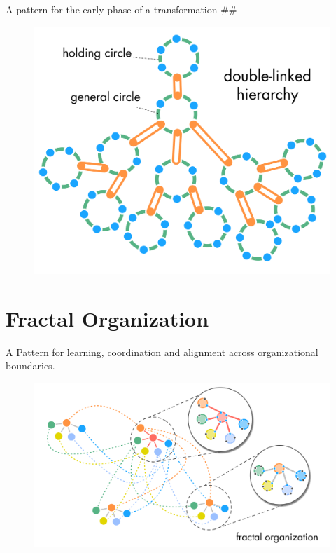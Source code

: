 A pattern for the early phase of a transformation \#\#

\begin{figure}[htbp]
\centering
\includegraphics[keepaspectratio,width=\textwidth,height=0.75\textheight]{img/structural-patterns/double-linked-hierarchy.png}
\end{figure}

\section{Fractal Organization}
\label{fractalorganization}

A Pattern for learning, coordination and alignment across organizational boundaries.

\begin{figure}[htbp]
\centering
\includegraphics[keepaspectratio,width=\textwidth,height=0.75\textheight]{img/structural-patterns/fractal-organization.png}
\end{figure}

